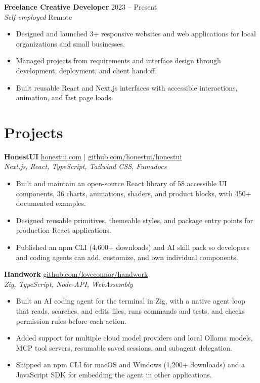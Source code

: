 \documentclass[10pt]{article}
\begin{document}
\textbf{Freelance Creative Developer} \hfill 2023 -- Present\\
\textit{Self-employed} \hfill Remote
\begin{itemize}
  \item Designed and launched 3+ responsive websites and web applications for local organizations and small businesses.
  \item Managed projects from requirements and interface design through development, deployment, and client handoff.
  \item Built reusable React and Next.js interfaces with accessible interactions, animation, and fast page loads.
\end{itemize}

\section*{Projects}
\textbf{HonestUI} \hfill \href{https://honestui.com}{honestui.com} \;|\; \href{https://github.com/honestui/honestui}{github.com/honestui/honestui}\\
\textit{Next.js, React, TypeScript, Tailwind CSS, Fumadocs}
\begin{itemize}
  \item Built and maintain an open-source React library of 58 accessible UI components, 36 charts, animations, shaders, and product blocks, with 450+ documented examples.
  \item Designed reusable primitives, themeable styles, and package entry points for production React applications.
  \item Published an npm CLI (4,600+ downloads) and AI skill pack so developers and coding agents can add, customize, and own individual components.
\end{itemize}

\textbf{Handwork} \hfill \href{https://github.com/loveconnor/handwork}{github.com/loveconnor/handwork}\\
\textit{Zig, TypeScript, Node-API, WebAssembly}
\begin{itemize}
  \item Built an AI coding agent for the terminal in Zig, with a native agent loop that reads, searches, and edits files, runs commands and tests, and checks permission rules before each action.
  \item Added support for multiple cloud model providers and local Ollama models, MCP tool servers, resumable saved sessions, and subagent delegation.
  \item Shipped an npm CLI for macOS and Windows (1,200+ downloads) and a JavaScript SDK for embedding the agent in other applications.
\end{itemize}
\end{document}
